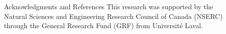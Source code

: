 \documentclass[final,hyperref={pdfpagelabels=false}]{beamer}
\begin{document}
\begin{frame}[t]
\begin{columns}[t]
\begin{column}{.03\textwidth}\end{column} %
 
\begin{column}{.465\textwidth} %
\begin{block}{Acknowledgments and References}
\footnotesize%
\noindent This research was supported by the Natural Sciences and Engineering Research Council of Canada (NSERC) through the General Research Fund (GRF) from Universit\'e Laval.
\nocite{*} %
%
{\footnotesize}
\vspace{-3mm}
\end{block}
\end{column}

\begin{column}{.015\textwidth}\end{column} %

\end{columns} %


%

\end{frame} %
\end{document}
